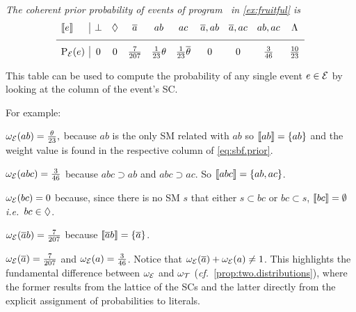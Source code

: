\documentclass[x11names]{tlp}
\begin{document}
\begin{example}
	\label{ex:prob.events}
	\em
	The coherent \emph{prior} probability of events of program \SBF\ in \cref{ex:fruitful} is
	\begin{equation}
		\begin{array}{l|ccccccccc}
			\stablecore{e}          &
			\inconsistent           &
			\indepclass             &
			\co{a}                  &
			ab                      &
			ac                      &
			\co{a}, ab              &
			\co{a}, ac              &
			ab, ac                  &
			\consequenceclass
			\\ \hline
			\prE\at{e}              &
			0                       &
			0                       &
			\frac{7}{207}           &
			\frac{1}{23}\theta      &
			\frac{1}{23}\co{\theta} &
			0                       &
			0                       &
			\frac{3}{46}            &
			\frac{10}{23}
		\end{array}
		\label{eq:sbf.prior}
	\end{equation}

	This table can be used to compute the probability of any single event $e \in {\mathcal{E}}$ by looking at the column of the event's \acl{SC}.

	For example:
	\begin{list}{\hspace{2em}}{\setlength\itemsep{0.5em}}
		\item $\wgtE\at{ab} = \frac{\theta}{23}, $ because $ab$ is the only \ac{SM} related with $ab$ so $\left\llbracket ab \right\rrbracket = \set{ab}$ and the weight value is found in the respective column of \cref{eq:sbf.prior}.

		\item $\wgtE\at{abc} = \frac{3}{46}$ because $abc \supset  ab$ and $abc \supset ac$.
		So $\left\llbracket abc \right\rrbracket = \set{ab, ac}$.

		\item $\wgtE\at{bc} = 0$ because, since there is no \ac{SM} $s$ that either $s \subset bc$ or $bc \subset s$, $\left\llbracket bc \right\rrbracket = \emptyset$ \emph{i.e.}\ $bc \in \Diamond$.

		\item $\wgtE\at{\co{a}b} = \frac{7}{207}$ because $\left\llbracket \overline{a}b \right\rrbracket = \set{\ensuremath{\overline{a}}}$.

		\item $\wgtE\at{\co{a}} = \frac{7}{207}$ and  $\wgtE\at{a} = \frac{3}{46}$.
		Notice that $\wgtE\at{\co{a}} + \wgtE\at{a} \not= 1$. 
		This highlights the fundamental difference between $\omega_{{\mathcal{E}}}$ and $\omega_{{\mathcal{T}}}$ (\emph{cf.~}\cref{prop:two.distributions}), where the former results from the lattice of the \aclp{SC} and the latter directly from the explicit assignment of probabilities to literals.
	\end{list}


\end{example}
\end{document}
